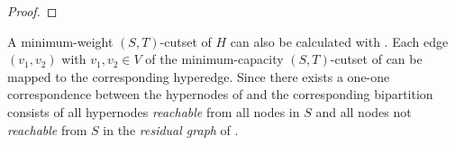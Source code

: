 \begin{proof}
%
\end{proof} 

A minimum-weight $(S,T)$-cutset of $H$ can also be calculated with . 
Each edge $(v_1,v_2)$ with $v_1,v_2 \in V$ of the minimum-capacity
$(S,T)$-cutset of  can be mapped to the corresponding hyperedge. 
Since there exists a one-one correspondence between the hypernodes
of  and  the corresponding bipartition consists of all hypernodes \emph{reachable}
from all nodes in $S$ and all nodes not \emph{reachable} from $S$ in the \emph{residual graph}
of . 

